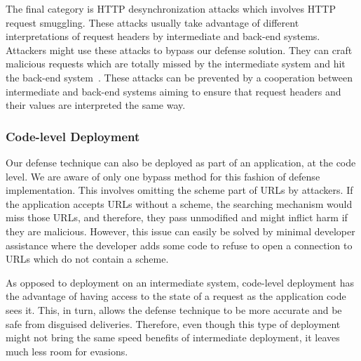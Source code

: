The final category is HTTP desynchronization attacks which involves HTTP request smuggling. These attacks usually take advantage of different interpretations of request headers by intermediate and back-end systems. Attackers might use these attacks to bypass our defense solution. They can craft malicious requests which are totally missed by the intermediate system and hit the back-end system~\cite{desync-bypass}. These attacks can be prevented by a cooperation between intermediate and back-end systems aiming to ensure that request headers and their values are interpreted the same way. %

\subsubsection{Code-level Deployment}
Our defense technique can also be deployed as part of an application, at the code level. We are aware of only one bypass method for this fashion of defense implementation. This involves omitting the scheme part of URLs by attackers. If the application accepts URLs without a scheme, the searching mechanism would miss those URLs, and therefore, they pass unmodified and might inflict harm if they are malicious. However, this issue can easily be solved by minimal developer assistance where the developer adds some code to refuse to open a connection to URLs which do not contain a scheme.

As opposed to deployment on an intermediate system, code-level deployment has the advantage of having access to the state of a request as the application code sees it. This, in turn, allows the defense technique to be more accurate and be safe from disguised deliveries. Therefore, even though this type of deployment might not bring the same speed benefits of intermediate deployment, it leaves much less room for evasions.


